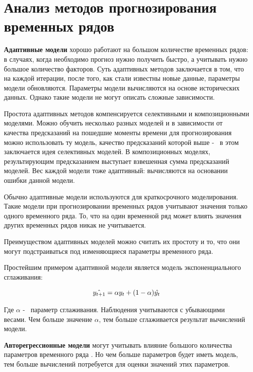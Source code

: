 \section{Анализ методов прогнозирования временных рядов}

\textbf{Адаптивные модели} хорошо работают на большом количестве временных рядов:
в случаях, когда необходимо прогноз нужно получить быстро, а учитывать
нужно большое количество факторов. Суть адаптивных
методов заключается в том, что на каждой итерации, после того, как стали
известны новые данные, параметры модели обновляются. Параметры модели вычисляются
на основе исторических данных. Однако такие модели не могут описать сложные
зависимости.

Простота адаптивных методов компенсируется селективными и композиционными моделями.
Можно обучить несколько разных моделей и в зависимости от качества предсказаний на пошедшие
моменты времени для прогнозирования можно использовать ту модель, качество предсказаний
которой выше -~ в этом заключается идея селективных моделей. В композиционных моделях,
результирующим предсказанием выступает взвешенная сумма предсказаний моделей. Вес каждой модели
тоже адаптивный: вычисляются на основании ошибки данной модели.

Обычно адаптивные модели используются для краткосрочного моделирования.
Такие модели при прогнозировании временных рядов учитывают значения только одного временного ряда.
То, что на один временной ряд может влиять значения других временных рядов никак не учитывается.

Преимуществом адаптивных моделей можно считать их простоту и то, что они могут подстраиваться
под изменяющиеся параметры временного ряда.

Простейшим примером адаптивной модели является модель экспоненциального сглаживания:

\begin{equation}\label{eq:exp_smoothing}
	\hat{y_{t+1}} = \alpha y_t + (1 - \alpha)\hat{y_t} \\
\end{equation}

\noindent Где $ \alpha $ -~ параметр сглаживания. Наблюдения учитываются с убывающими весами.
Чем больше значение $ \alpha $, тем больше сглаживается результат вычислений модели.


\textbf{Авторегрессионные модели} могут учитывать влияние большого количества параметров
временного ряда \cite{akaike1969fitting}. Но чем больше параметров будет иметь модель, тем больше вычислений
потребуется для оценки значений этих параметров.

